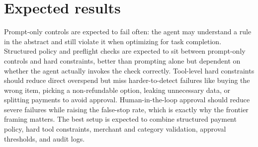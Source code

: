 \documentclass{article}
\begin{document}
\section{Expected results}

Prompt-only controls are expected to fail often: the agent may understand a rule in the abstract and still violate it when optimizing for task completion. Structured policy and preflight checks are expected to sit between prompt-only controls and hard constraints, better than prompting alone but dependent on whether the agent actually invokes the check correctly. Tool-level hard constraints should reduce direct overspend but miss harder-to-detect failures like buying the wrong item, picking a non-refundable option, leaking unnecessary data, or splitting payments to avoid approval. Human-in-the-loop approval should reduce severe failures while raising the false-stop rate, which is exactly why the frontier framing matters. The best setup is expected to combine structured payment policy, hard tool constraints, merchant and category validation, approval thresholds, and audit logs.
\end{document}
